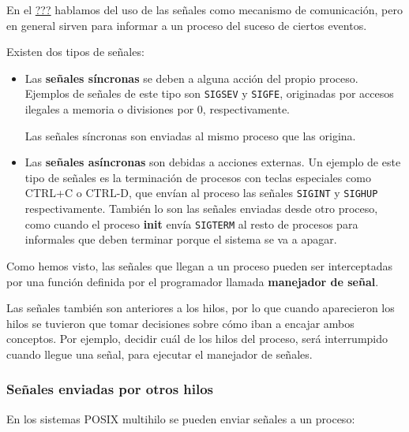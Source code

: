 En el \hyperref[_seuxf1ales_en_sistemas_operativos_posix]{???} hablamos
del uso de las señales{} como mecanismo de comunicación, pero en general
sirven para informar a un proceso del suceso de ciertos eventos.

Existen dos tipos de señales:

\begin{itemize}
\item
  Las \textbf{señales síncronas}{} se deben a alguna acción del propio
  proceso. Ejemplos de señales de este tipo son \texttt{SIGSEV} y
  \texttt{SIGFE}, originadas por accesos ilegales a memoria o divisiones
  por 0, respectivamente.

  Las señales síncronas son enviadas al mismo proceso que las origina.
\item
  Las \textbf{señales asíncronas}{} son debidas a acciones externas. Un
  ejemplo de este tipo de señales es la terminación de procesos con
  teclas especiales como {CTRL+C} o CTRL-D, que envían al proceso las
  señales \texttt{SIGINT} y \texttt{SIGHUP} respectivamente. También lo
  son las señales enviadas desde otro proceso, como cuando el proceso
  \textbf{init} envía \texttt{SIGTERM} al resto de procesos para
  informales que deben terminar porque el sistema se va a apagar.
\end{itemize}

Como hemos visto, las señales que llegan a un proceso pueden ser
interceptadas por una función definida por el programador llamada
\textbf{manejador de señal}{}.

Las señales también son anteriores a los hilos, por lo que cuando
aparecieron los hilos se tuvieron que tomar decisiones sobre cómo iban a
encajar ambos conceptos. Por ejemplo, decidir cuál de los hilos del
proceso, será interrumpido cuando llegue una señal, para ejecutar el
manejador de señales.

\subsubsection{Señales enviadas por otros
hilos}\label{_seuxf1ales_enviadas_por_otros_hilos}

En los sistemas POSIX multihilo se pueden enviar señales a un proceso:

\begin{Shaded}
\begin{Highlighting}[]
\OperatorTok{(}\OperatorTok{,}\OperatorTok{);}
\end{Highlighting}
\end{Shaded}

